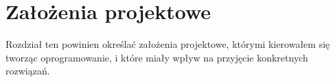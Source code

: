 \chapter{Założenia projektowe}
Rozdział ten powinien określać założenia projektowe, którymi kierowałem się tworząc oprogramowanie, i które miały wpływ
na przyjęcie konkretnych rozwiązań.



